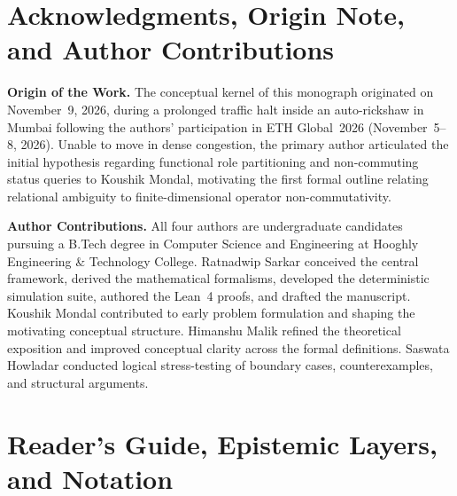 \clearpage
\hypersetup{pageanchor=true}
\tableofcontents
\clearpage
\listoffigures
\listoftables
\clearpage
{}
{}
\section*{Acknowledgments, Origin Note, and Author Contributions}
%

\noindent\textbf{Origin of the Work.}\;
The conceptual kernel of this monograph originated on November~9, 2026, during a
prolonged traffic halt inside an auto-rickshaw in Mumbai following the authors'
participation in ETH Global~2026 (November~5--8, 2026). Unable to move in dense
congestion, the primary author articulated the initial hypothesis regarding
functional role partitioning and non-commuting status queries to Koushik Mondal,
motivating the first formal outline relating relational ambiguity to finite-dimensional
operator non-commutativity.

\medskip
\noindent\textbf{Author Contributions.}\;
All four authors are undergraduate candidates pursuing a B.Tech degree in Computer
Science and Engineering at Hooghly Engineering \& Technology College. Ratnadwip Sarkar
conceived the central framework, derived the mathematical formalisms, developed the
deterministic simulation suite, authored the Lean~4 proofs, and drafted the manuscript.
Koushik Mondal contributed to early problem formulation and shaping the motivating
conceptual structure. Himanshu Malik refined the theoretical exposition and improved
conceptual clarity across the formal definitions. Saswata Howladar conducted logical
stress-testing of boundary cases, counterexamples, and structural arguments.

\clearpage
{}
{}
\section*{Reader's Guide, Epistemic Layers, and Notation}
%

